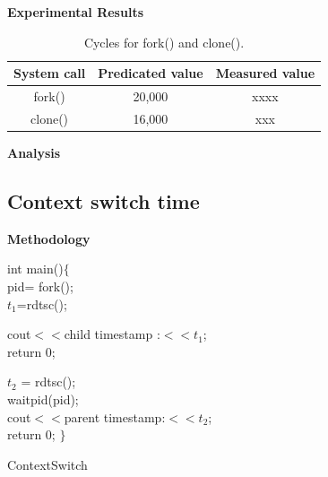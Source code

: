 \noindent\textbf{Experimental Results}


\begin{table}[!htp]
\centering
\begin{tabular}{c|c|c}\hline\hline
 System call & Predicated value & Measured value \\
 \hline
 fork() & 20,000 & xxxx \\
 \hline
clone() & 16,000 & xxx \\ \hline\hline
\end{tabular}
\caption{Cycles for fork() and clone().}
\label{analysis:size_columndb}
\end{table}

\noindent\textbf{Analysis}

\subsection{Context switch time}

\noindent\textbf{Methodology}

{\LinesNumberedHidden
\begin{algorithm}[htbp]
int main()$\{$\\
    pid= fork();\\
    $t_1$=rdtsc();\\
    {
        cout$<<$child timestamp :$<<$$t_1$;\\
        return 0;

    }
    \Else
    {
       $t_2$ = rdtsc();\\
        waitpid(pid);\\
        cout$<<$parent timestamp:$<<$$t_2$;\\
        return 0;
    }
$\}$
\caption{ContextSwitch}\label{FastR}
\end{algorithm}
}


